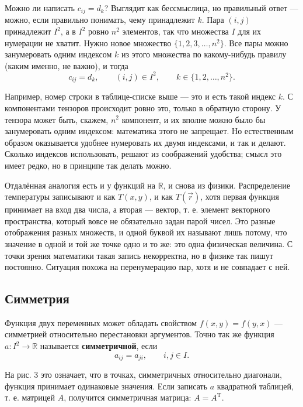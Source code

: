 \documentclass[11pt,a4paper]{article}
\begin{document}
Можно ли написать $c_{ij} = d_k$? Выглядит как бессмыслица, но правильный ответ — можно, если правильно понимать, чему принадлежит $k$. Пара $(i, j)$ принадлежит $I^2$, а в $I^2$ ровно $n^2$ элементов, так что множества $I$ для их нумерации не хватит. Нужно новое множество $\{1, 2, 3, \dots, n^2\}$. Все пары можно занумеровать одним индексом $k$ из этого множества по какому-нибудь правилу (каким именно, не важно), и тогда
\[
c_{ij} = d_k, \qquad (i, j) \in I^2, \qquad k \in \{1, 2, \dots, n^2\}.
\]

Например, номер строки в таблице-списке выше — это и есть такой индекс $k$. С компонентами тензоров происходит ровно это, только в обратную сторону. У тензора может быть, скажем, $n^2$ компонент, и их вполне можно было бы занумеровать одним индексом: математика этого не запрещает. Но естественным образом оказывается удобнее нумеровать их двумя индексами, и так и делают. Сколько индексов использовать, решают из соображений удобства; смысл это имеет редко, но в принципе так делать можно.

Отдалённая аналогия есть и у функций на $\mathbb{R}$, и снова из физики. Распределение температуры записывают и как $T(x, y)$, и как $T(\vec r)$, хотя первая функция принимает на вход два числа, а вторая — вектор, т. е. элемент векторного пространства, который вовсе не обязательно задан парой чисел. Это разные отображения разных множеств, и одной буквой их называют лишь потому, что значение в одной и той же точке одно и то же: это одна физическая величина. С точки зрения математики такая запись некорректна, но в физике так пишут постоянно. Ситуация похожа на перенумерацию пар, хотя и не совпадает с ней.


\subsection{Симметрия}

Функция двух переменных может обладать свойством $f(x, y) = f(y, x)$ — симметрией относительно перестановки аргументов. Точно так же функция $a\colon I^2 \to \mathbb{R}$ называется \textbf{симметричной}, если
\[
a_{ij} = a_{ji}, \qquad i, j \in I.
\]

На рис. 3 это означает, что в точках, симметричных относительно диагонали, функция принимает одинаковые значения. Если записать $a$ квадратной таблицей, т. е. матрицей $A$, получится симметричная матрица: $A = A^{\mathrm{T}}$.
\end{document}
